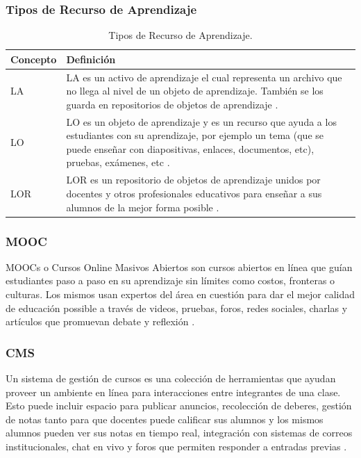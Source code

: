 \subsubsection{Tipos de Recurso de Aprendizaje}
\begin{table}[h!]
	\small
    \begin{tabular}{|p{}|p{}|}
        \hline
        Concepto & Definición \\
        \hline
        LA & LA es un activo de aprendizaje el cual representa un archivo que no llega al nivel de un objeto de aprendizaje. También se los guarda en repositorios de objetos de aprendizaje \citep{GOVIEW-LOR}. \\
        \hline
        LO & LO es un objeto de aprendizaje y es un recurso que ayuda a los estudiantes con su aprendizaje, por ejemplo un tema (que se puede enseñar con diapositivas, enlaces, documentos, etc), pruebas, exámenes, etc \citep{GOVIEW-LOR}. \\
        \hline
        LOR & LOR es un repositorio de objetos de aprendizaje unidos por docentes y otros profesionales educativos para enseñar a sus alumnos de la mejor forma posible \citep{GOVIEW-LOR}. \\
        \hline
    \end{tabular}
	\caption{Tipos de Recurso de Aprendizaje.}
    \label{tipos-recurso-aprendizaje}
\end{table}

\subsubsection{MOOC}
MOOCs o Cursos Online Masivos Abiertos son cursos abiertos en línea que guían estudiantes paso a paso en su aprendizaje sin límites como costos, fronteras o culturas. Los mismos usan expertos del área en cuestión para dar el mejor calidad de educación possible a través de videos, pruebas, foros, redes sociales, charlas y artículos que promuevan debate y reflexión \citep{UEA-What-is-a-MOOC}.

\subsubsection{CMS}
Un sistema de gestión de cursos es una colección de herramientas que ayudan proveer un ambiente en línea para interacciones entre integrantes de una clase. Esto puede incluir espacio para publicar anuncios, recolección de deberes, gestión de notas tanto para que docentes puede calificar sus alumnos y los mismos alumnos pueden ver sus notas en tiempo real, integración con sistemas de correos institucionales, chat en vivo y foros que permiten responder a entradas previas  \citep{Vanderbilt-Course-Management-Systems}.

